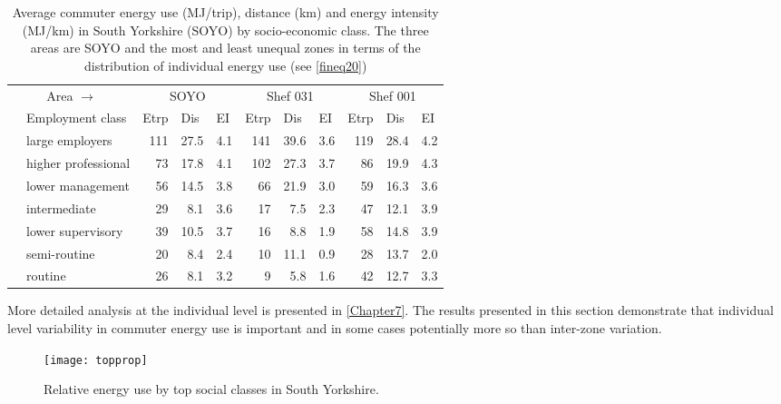 \begin{table}[htbp]
\caption[Commuter energy use in South Yorkshire areas by class]
{Average commuter energy use (MJ/trip), distance (km) and energy intensity (MJ/km)
in South Yorkshire (SOYO) by socio-economic class.
The three areas are SOYO and the most and least
unequal zones in terms of the distribution of individual energy use (see
\cref{fineq20})}
\begin{tabular}{rl|rrr|rrr|rrr}
\toprule
\multicolumn{2}{c}{Area $\rightarrow$} &  \multicolumn{3}{|c|}{SOYO}  & \multicolumn{3}{c}{Shef 031} & \multicolumn{3}{|c}{Shef 001} \\
\multicolumn{1}{l}{} & Employment class & \multicolumn{1}{l}{Etrp} & \multicolumn{1}{l}{Dis} & \multicolumn{1}{l}{EI} & \multicolumn{1}{|l}{Etrp} & \multicolumn{1}{l}{Dis} & \multicolumn{1}{l}{EI} & \multicolumn{1}{|l}{Etrp} & \multicolumn{1}{l}{Dis} & \multicolumn{1}{l}{EI } \\
\midrule
 & large employers  & 111 & 27.5 & 4.1 & 141 & 39.6 & 3.6 & 119 & 28.4 & 4.2 \\
 & higher professional & 73 & 17.8 & 4.1 & 102 & 27.3 & 3.7 & 86 & 19.9 & 4.3 \\
 & lower management  & 56 & 14.5 & 3.8 & 66 & 21.9 & 3.0 & 59 & 16.3 & 3.6 \\
 & intermediate & 29 & 8.1 & 3.6 & 17 & 7.5 & 2.3 & 47 & 12.1 & 3.9 \\
 & lower supervisory  & 39 & 10.5 & 3.7 & 16 & 8.8 & 1.9 & 58 & 14.8 & 3.9 \\
 & semi-routine & 20 & 8.4 & 2.4 & 10 & 11.1 & 0.9 & 28 & 13.7 & 2.0 \\
 & routine & 26 & 8.1 & 3.2 & 9 & 5.8 & 1.6 & 42 & 12.7 & 3.3 \\
 \bottomrule
\end{tabular}
\label{tindenergy}
\end{table}

More detailed analysis at the individual
level is presented in \cref{Chapter7}. The results presented in this section
demonstrate that individual level variability in commuter energy use
is important and in some cases potentially more so than inter-zone variation.



\begin{figure}[htbp]
\begin{center}
    \texttt{[image: topprop]}  \end{center}
  \caption[Relative energy use by top social classes]
  {Relative energy use by top social classes in South Yorkshire.}
 \label{ftopprop}
\end{figure}


